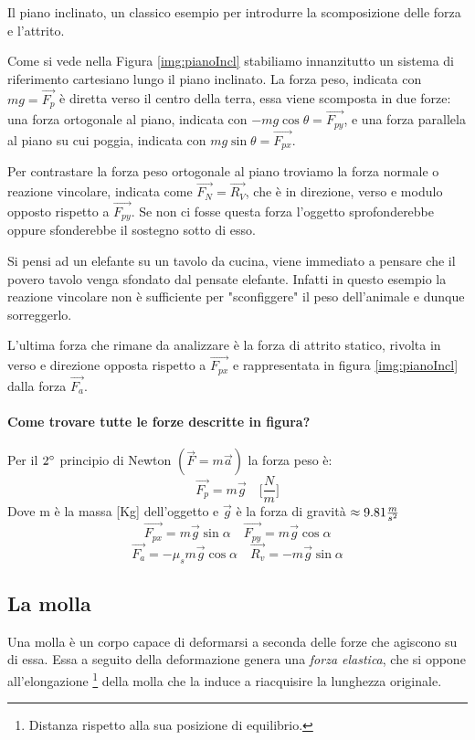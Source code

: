 Il piano inclinato, un classico esempio per introdurre la scomposizione delle forza e l'attrito.

Come si vede nella Figura \ref{img:pianoIncl} stabiliamo innanzitutto un sistema di riferimento cartesiano lungo il piano inclinato. La forza peso, indicata con $ mg = \vec{F_p}$ è diretta verso il centro della terra, essa viene scomposta in due forze: una forza ortogonale al piano, indicata con $-mg\cos\theta = \vec{F_{py}}$, e una forza parallela al piano su cui poggia, indicata con $mg\sin\theta = \vec{F_{px}}$.

Per contrastare la forza peso ortogonale al piano troviamo la forza normale o reazione vincolare, indicata come $\vec{F_N} = \vec{R_V}$, che è  in direzione, verso e modulo opposto rispetto a $\vec{F_{py}}$. Se non ci fosse questa forza l'oggetto sprofonderebbe oppure sfonderebbe il sostegno sotto di esso. 

Si pensi ad un elefante su un tavolo da cucina, viene immediato a pensare che il povero tavolo venga sfondato dal pensate elefante. Infatti in questo esempio la reazione vincolare non è sufficiente per "sconfiggere" il peso dell'animale e dunque sorreggerlo.

L'ultima forza che rimane da analizzare è la forza di attrito statico, rivolta in verso e direzione opposta rispetto a $\vec{F_{px}}$ e rappresentata in figura \ref{img:pianoIncl} dalla forza $\vec{F_a}$.

\paragraph{Come trovare tutte le forze descritte in figura?}

Per il $2^\circ$ principio di Newton $(\vec{F} = m\vec{a})$ la forza peso è: 
\begin{equation*}
    \vec{F_p} = m\vec{g}\quad\bigg[\frac{N}{m}\bigg]
\end{equation*}
Dove m è la massa [Kg] dell'oggetto e $\vec{g}$ è la forza di gravità $\approx 9.81\frac{m}{s^2}$
\begin{equation*}
    \vec{F_{px}} = m\vec{g}\sin{\alpha}\quad \vec{F_{py}} = m\vec{g}\cos{\alpha}
\end{equation*}
\begin{equation*}
    \vec{F_a} = -\mu_s m\vec{g}\cos{\alpha}\quad \vec{R_v} = -m\vec{g}\sin{\alpha}
\end{equation*}



\subsection{La molla}
Una molla è un corpo capace di deformarsi a seconda delle forze che agiscono su di essa. Essa a seguito della deformazione genera una \textit{forza elastica}, che si oppone all'elongazione \footnote{Distanza rispetto alla sua posizione di equilibrio.} della molla che la induce a riacquisire la lunghezza originale.

